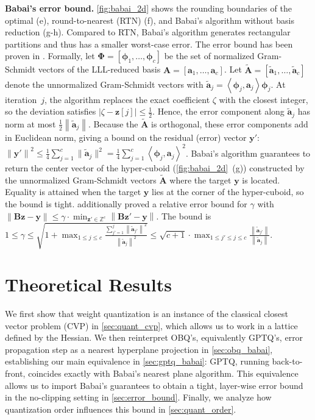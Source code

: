 \documentclass{article} %
\begin{document}
\textbf{Babai's error bound.}
\cref{fig:babai_2d} shows the rounding boundaries of the optimal (e), round-to-nearest (RTN) (f), and Babai's algorithm without basis reduction (g-h). Compared to RTN, Babai's algorithm generates rectangular partitions and thus has a smaller worst-case error.
The error bound has been proven in \citet{babai1986}.
Formally, let $\bm{\Phi} = \left[ \bm{\phi}_{1}, \dots, \bm{\phi}_{c} \right]$ be the set of normalized Gram-Schmidt vectors of the LLL-reduced basis $\bm{A} = \left[ \bm{a}_{1}, \dots, \bm{a}_{c} \right]$. Let $\tilde{\bm{A}} = \left[ \tilde{\bm{a}}_{1}, \dots, \tilde{\bm{a}}_{c} \right]$ denote the unnormalized Gram-Schmidt vectors with $\tilde{\bm{a}}_{j} = \left< \bm{\phi}_{j} , \bm{a}_{j} \right> \bm{\phi}_{j}$.
At iteration~$j$, the algorithm replaces the exact coefficient $\zeta$ with the closest integer, so the deviation satisfies
$\left| \zeta - \bm{z} [j] \right| \le \frac{1}{2}$.
Hence, the error component along $\tilde{\bm{a}}_{j}$ has norm at most $\frac{1}{2} \left\| \tilde{\bm{a}}_{j} \right\|$.
Because the $\tilde{\bm{A}}$ is orthogonal, these error components add in Euclidean norm, giving a bound on the residual (error) vector $\bm{y}'$:
$\left\| \bm{y}' \right\|^2 \le \frac{1}{4} \sum_{j=1}^{c}\| \tilde{\bm{a}}_{j}\|^2 = \frac{1}{4} \sum_{j=1}^{c} \left< \bm{\phi}_{j} , \bm{a}_{j} \right>^2$.
Babai's algorithm guarantees to return the center vector of the hyper-cuboid (\cref{fig:babai_2d}~(g)) constructed by the unnormalized Gram-Schmidt vectors $\tilde{\bm{A}}$ where the target $\bm{y}$ is located.
Equality is attained when the target $\bm{y}$ lies at the corner of the hyper-cuboid, so the bound is tight.
\citet{babai1986} additionally proved a relative error bound for $\gamma$ with $\left\| \bm{B} \bm{z} - \bm{y} \right\| \le \gamma \cdot \min_{\bm{z}' \in \mathbb{Z}^{c}} \left\| \bm{B} \bm{z}' - \bm{y} \right\|$. The bound is $
1 \le \gamma \le \sqrt{1 + \max_{1 \le j \le c} \frac{\sum_{j'=1}^{j} \left\| \tilde{\bm{a}}_{j'} \right\|^{2}}{\left\| \tilde{\bm{a}}_{j} \right\|^{2}}}
\le \sqrt{c + 1} \cdot \max_{1 \le j' \le j \le c} \frac{\left\| \tilde{\bm{a}}_{j'} \right\|}{\left\| \tilde{\bm{a}}_{j} \right\|}
$.

\section{Theoretical Results}
\label{sec:theory}

We first show that weight quantization is an instance of the classical closest vector problem (CVP) in \cref{sec:quant_cvp}, which allows us to work in a lattice defined by the Hessian. We then reinterpret OBQ's, equivalently GPTQ's, error propagation step as a nearest hyperplane projection in \cref{sec:obq_babai}, establishing our main equivalence in \cref{sec:gptq_babai}: GPTQ, running back-to-front, coincides exactly with Babai's nearest plane algorithm. This equivalence allows us to import Babai's guarantees to obtain a tight, layer-wise error bound in the no-clipping setting in \cref{sec:error_bound}. Finally, we analyze how quantization order influences this bound in \cref{sec:quant_order}.
\end{document}
